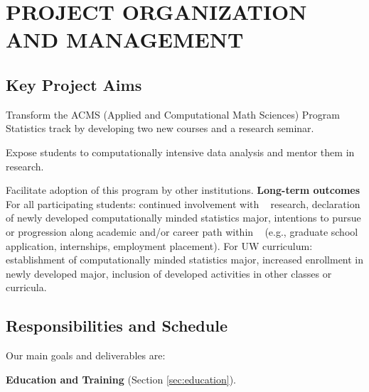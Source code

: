 \section{PROJECT ORGANIZATION AND MANAGEMENT}
\label{plan}

\subsection{                      Key Project Aims                   }
\label{sec:key-aims}
 
\bits
\item Transform the ACMS (Applied and Computational Math Sciences) Program Statistics track
by developing two new courses and a research seminar. 
\item Expose students to computationally intensive data analysis and mentor them in research. 
\item Facilitate adoption of this program by other institutions.
\eits  
{\bf Long-term outcomes} For all participating students: 
continued involvement with \cdse~ research, 
declaration of newly developed computationally minded statistics major,
intentions to pursue or progression along academic and/or career path within \cdse~ (e.g., graduate school application, internships, employment placement). 
For UW curriculum: establishment of computationally minded statistics major,
increased enrollment in newly developed major, inclusion of developed activities in other classes or curricula.


\subsection{Responsibilities and Schedule}

\noindent Our main goals and deliverables are: 
\bits
\item {\bf Education and Training} (Section \ref{sec:education}).

